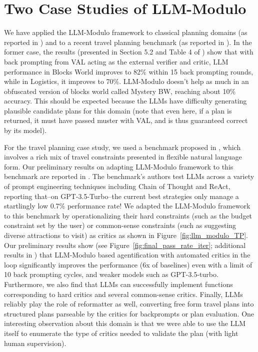 \documentclass{article}
\theoremstyle{plain}
\theoremstyle{definition}
\theoremstyle{remark}
\begin{document}
\section{Two Case Studies of LLM-Modulo}
\label{sec:case-studies}
We have applied the LLM-Modulo framework to classical planning domains (as reported in \cite{valmeekam2023on}) and to a recent travel planning benchmark (as reported in \cite{llm-modulo-travel-planning}). In the former case, the results (presented in Section 5.2 and Table 4 of \cite{valmeekam2023on}) show that with back prompting from VAL \cite{howey2004val} acting as the external verifier and critic, LLM performance in Blocks World improves to 82\% within 15 back prompting rounds, while in Logistics, it improves to 70\%. LLM-Modulo doesn't help as much in an obfuscated version of blocks world called Mystery BW, reaching about 10\% accuracy. This should be expected because the LLMs have difficulty generating plausible candidate plans for this domain (note that even here, if a plan is returned, it must have passed muster with VAL, and is thus guaranteed correct by its model). 

%

For the travel planning case study, we used a benchmark proposed in \cite{xie2024travelplanner}, which involves a rich mix of travel constraints presented in flexible natural language form. Our preliminary results on adapting LLM-Modulo framework to this benchmark are reported in \cite{llm-modulo-travel-planning}. 
The benchmark's authors test LLMs across a variety of prompt engineering techniques including Chain of Thought and ReAct, reporting that--on GPT-3.5-Turbo--the current best strategies only manage a startlingly low 0.7\% performance rate!
We adapted the LLM-Modulo framework to this benchmark by operationalizing their hard constraints (such as the budget constraint set by the user) or common-sense constraints (such as suggesting diverse attractions to visit) as critics as shown in Figure~\ref{fig:llm_modulo_TP}.  Our preliminary results show (see Figure~\ref{fig:final_pass_rate_iter}; additional results in \cite{llm-modulo-travel-planning}) that LLM-Modulo based agentification with automated critics in the loop significantly improves the performance (6x of baselines) even with a limit of 10 back prompting cycles, and weaker models such as GPT-3.5-turbo. Furthermore, we also find that LLMs can successfully implement functions corresponding to hard critics and several common-sense critics. Finally, LLMs reliably play the role of reformatter as well, converting free form travel plans into structured plans parseable by the critics for backprompts or plan evaluation. One interesting observation about this domain is that we were able to use the LLM itself to enumerate the type of critics needed to validate the plan (with light human supervision). 
\end{document}
